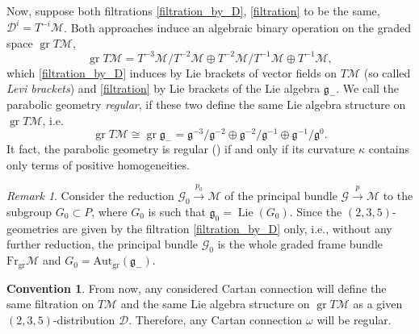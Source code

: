 \documentclass{amsart}
\theoremstyle{plain}
\theoremstyle{definition}
\newtheorem*{convention}{Convention}
\theoremstyle{remark}
\newtheorem*{remark}{Remark}
\newcommand{\xlra}[1]{\xrightarrow{\ #1\ }}
\newcommand{\mc}[1]{\mathcal{#1}}
\newcommand{\mfk}[1]{\mathfrak{#1}}
\newcommand{\on}[1]{\operatorname{#1}}
\begin{document}
Now, suppose both filtrations \eqref{filtration_by_D}, \eqref{filtration} to be the same, $\mc{D}^i = T^{-i}\mc{M}$.
Both approaches induce an algebraic binary operation on the graded space $\on{gr} T\mc{M}$,
\begin{equation}\label{grTM}
    \on{gr} T\mc{M} = T^{-3}\mc{M}/T^{-2}\mc{M} \oplus T^{-2}\mc{M}/T^{-1}\mc{M} \oplus T^{-1}\mc{M},
\end{equation}
which \eqref{filtration_by_D} induces by Lie brackets of vector fields on $T\mc{M}$ (so called \emph{Levi brackets}) and \eqref{filtration} by Lie brackets of the Lie algebra $\mfk{g}_-$. We call the parabolic geometry \emph{regular}, if these two define the same Lie algebra structure on $\on{gr} T\mc{M}$, i.e.
\begin{equation}\label{gr_g-}
    \on{gr}T\mc{M} \cong \on{gr} \mfk{g}_- = \mfk{g}^{-3} / \mfk{g}^{-2} \oplus \mfk{g}^{-2} / \mfk{g}^{-1} \oplus \mfk{g}^{-1} / \mfk{g}^0.
\end{equation}
It fact, the parabolic geometry is regular (\cite[p.]{parabook}) if and only if its curvature $\kappa$ contains only terms of positive homogeneities.

\begin{remark}
    Consider the reduction $\mc{G}_0 \xlra{p_0} \mc{M}$ of the principal bundle $\mc{G} \xlra{p} \mc{M}$ to the subgroup $G_0 \subset P$, where $G_0$ is such that $\mfk{g}_0 = \on{Lie}(G_0)$. Since the $(2,3,5)$-geometries are given by the filtration \eqref{filtration_by_D} only, i.e., without any further reduction, the principal bundle $\mc{G}_0$ is the whole graded frame bundle $\on{Fr_{gr}}\mc{M}$ and $G_0 = \on{Aut_{gr}}(\mfk{g}_-)$.
\end{remark}

\begin{convention}
    From now, any considered Cartan connection will define the same filtration on $T\mc{M}$ and the same Lie algebra structure on $\on{gr} T\mc{M}$ as a given $(2,3,5)$-distribution $\mc{D}$. Therefore, any Cartan connection $\omega$ will be regular.
\end{convention}
\end{document}
